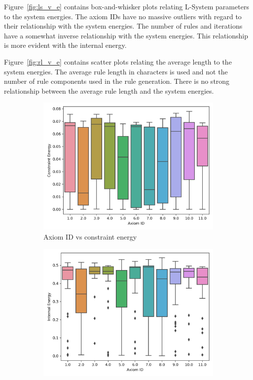 Figure~\ref{fig:ls_v_e} contains box-and-whisker plots relating L-System parameters to the system energies. The axiom IDs have no massive outliers with regard to their relationship with the system energies. The number of rules and iterations have a somewhat inverse relationship with the system energies. This relationship is more evident with the internal energy.

Figure~\ref{fig:rl_v_e} contains scatter plots relating the average length to the system energies. The average rule length in characters is used and not the number of rule components used in the rule generation. There is no strong relationship between the average rule length and the system energies.

\begin{figure}[H]
	\centering
	\begin{subfigure}[t]{0.45\textwidth}
		\centering
		\includegraphics[width=\textwidth]{aid_vs_ce.png}
		\caption{Axiom ID vs constraint energy}
	\end{subfigure}
	\hfill
	\begin{subfigure}[t]{0.45\textwidth}
		\centering
		\includegraphics[width=\textwidth]{aid_vs_ie.png}

\end{subfigure}
\end{figure}
